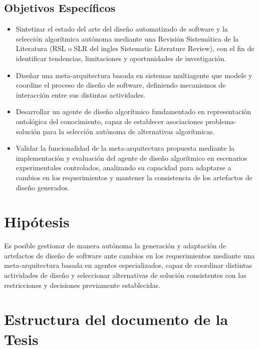 \documentclass[12pt, letterpaper, oneside]{book}
\begin{document}
\subsection{Objetivos Específicos}
\begin{itemize}
	
	\item Sintetizar el estado del arte del diseño automatizado de software y la selección algorítmica autónoma mediante una Revisión Sistemática de la Literatura (RSL o SLR del ingles Sistematic Literature Review), con el fin de identificar tendencias, limitaciones y oportunidades de investigación.
	
	\item Diseñar una meta-arquitectura basada en sistemas multiagente que modele y coordine el proceso de diseño de software, definiendo mecanismos de interacción entre sus distintas actividades.
	
	\item Desarrollar un agente de diseño algorítmico fundamentado en representación ontológica del conocimiento, capaz de establecer asociaciones problema-solución para la selección autónoma de alternativas algorítmicas.
	
	\item Validar la funcionalidad de la meta-arquitectura propuesta mediante la implementación y evaluación del agente de diseño algorítmico en escenarios experimentales controlados, analizando su capacidad para adaptarse a cambios en los requerimientos y mantener la consistencia de los artefactos de diseño generados.
	
\end{itemize}



\section{Hipótesis}

Es posible gestionar de manera autónoma la generación y adaptación de artefactos de diseño de software ante cambios en los requerimientos mediante una meta-arquitectura basada en agentes especializados, capaz de coordinar distintas actividades de diseño y seleccionar alternativas de solución consistentes con las restricciones y decisiones previamente establecidas.


\section{Estructura del documento de la Tesis}
\end{document}

